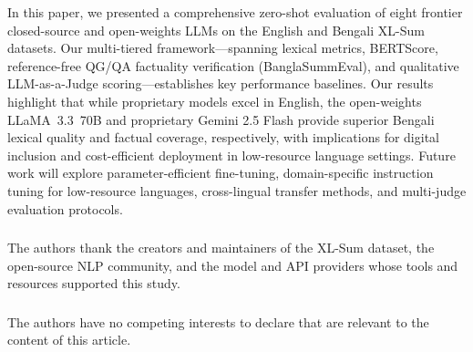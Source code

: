 \documentclass[runningheads]{llncs}
\begin{document}
In this paper, we presented a comprehensive zero-shot evaluation of eight frontier closed-source and open-weights LLMs on the English and Bengali XL-Sum datasets. Our multi-tiered framework---spanning lexical metrics, BERTScore, reference-free QG/QA factuality verification (BanglaSummEval), and qualitative LLM-as-a-Judge scoring---establishes key performance baselines. Our results highlight that while proprietary models excel in English, the open-weights LLaMA~3.3~70B and proprietary Gemini 2.5 Flash provide superior Bengali lexical quality and factual coverage, respectively, with implications for digital inclusion and cost-efficient deployment in low-resource language settings. Future work will explore parameter-efficient fine-tuning, domain-specific instruction tuning for low-resource languages, cross-lingual transfer methods, and multi-judge evaluation protocols.

\begin{credits}
\subsubsection{\ackname}
The authors thank the creators and maintainers of the XL-Sum dataset, the open-source NLP community, and the model and API providers whose tools and resources supported this study.

\subsubsection{\discintname}
The authors have no competing interests to declare that are relevant to the content of this article.
\end{credits}
\end{document}

